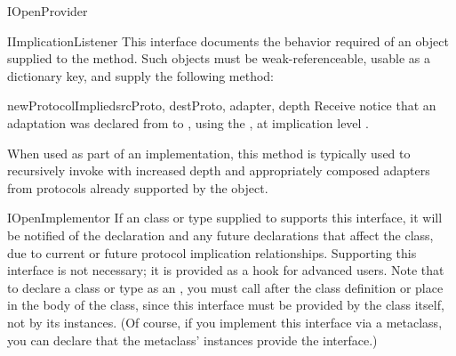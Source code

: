 \begin{verbatim%
}
\begin{verbatim%
}
\begin{verbatim%
}
\begin{verbatim%
}
\begin{verbatim%
}
\begin{verbatim%
}
\begin{classdesc*}{IOpenProvider}
\end{classdesc*}

















\begin{classdesc*}{IImplicationListener}
This interface documents the behavior required of an object supplied to
the  method.  Such objects must
be weak-referenceable, usable as a dictionary key, and supply the following
method:

\begin{methoddesc}{newProtocolImplied}{srcProto, destProto, adapter, depth}
Receive notice that an adaptation was declared from  to
, using the  , at
implication level .

When used as part of an  implementation, this method is
typically used to recursively invoke  with
increased depth and appropriately composed adapters from protocols already
supported by the object.
\end{methoddesc}

\end{classdesc*}























\begin{classdesc*}{IOpenImplementor}
If an class or type supplied to  supports
this interface, it will be notified of the declaration and any future
declarations that affect the class, due to current or future protocol
implication relationships.  Supporting this interface is not necessary; it is
provided as a hook for advanced users.  Note that to declare a class or type
as an , you must call  after the class definition or place
 in the body of the class, since
this interface must be provided by the class itself, not by its instances.  (Of
course, if you implement this interface via a metaclass, you can declare that
the metaclass' instances provide the interface.)


\end{classdesc*}
\end{verbatim%
}
\end{verbatim%
}
\end{verbatim%
}
\end{verbatim%
}
\end{verbatim%
}
\end{verbatim%
}
